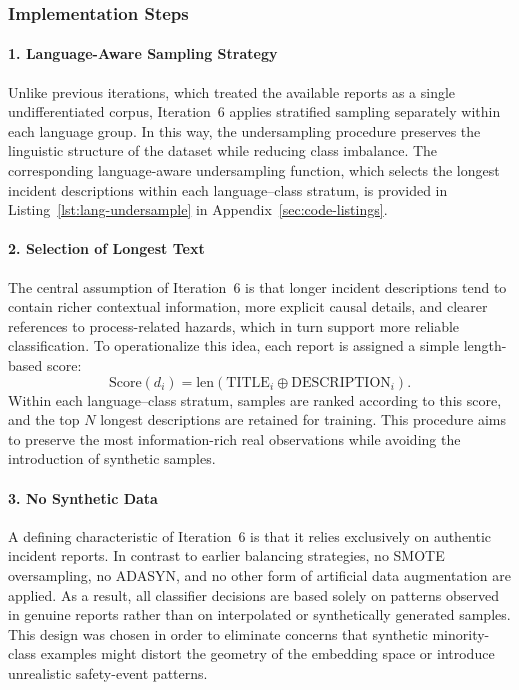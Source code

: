 \documentclass[11pt, titlepage, bibliography=totoc]{scrreprt}
\begin{document}
\subsubsection{Implementation Steps}

\paragraph{1. Language-Aware Sampling Strategy}
Unlike previous iterations, which treated the available reports as a single undifferentiated corpus, Iteration~6 applies stratified sampling separately within each language group. In this way, the undersampling procedure preserves the linguistic structure of the dataset while reducing class imbalance. The corresponding language-aware undersampling function, which selects the longest incident descriptions within each language--class stratum, is provided in Listing~\ref{lst:lang-undersample} in Appendix~\ref{sec:code-listings}.

\paragraph{2. Selection of Longest Text}
The central assumption of Iteration~6 is that longer incident descriptions tend to contain richer contextual information, more explicit causal details, and clearer references to process-related hazards, which in turn support more reliable classification. To operationalize this idea, each report is assigned a simple length-based score:
\begin{equation}
\text{Score}(d_i) = \text{len}(\text{TITLE}_i \oplus \text{DESCRIPTION}_i).
\end{equation}
Within each language--class stratum, samples are ranked according to this score, and the top $N$ longest descriptions are retained for training. This procedure aims to preserve the most information-rich real observations while avoiding the introduction of synthetic samples.

\paragraph{3. No Synthetic Data}
A defining characteristic of Iteration~6 is that it relies exclusively on authentic incident reports. In contrast to earlier balancing strategies, no SMOTE oversampling, no ADASYN, and no other form of artificial data augmentation are applied. As a result, all classifier decisions are based solely on patterns observed in genuine reports rather than on interpolated or synthetically generated samples. This design was chosen in order to eliminate concerns that synthetic minority-class examples might distort the geometry of the embedding space or introduce unrealistic safety-event patterns.
\end{document}
